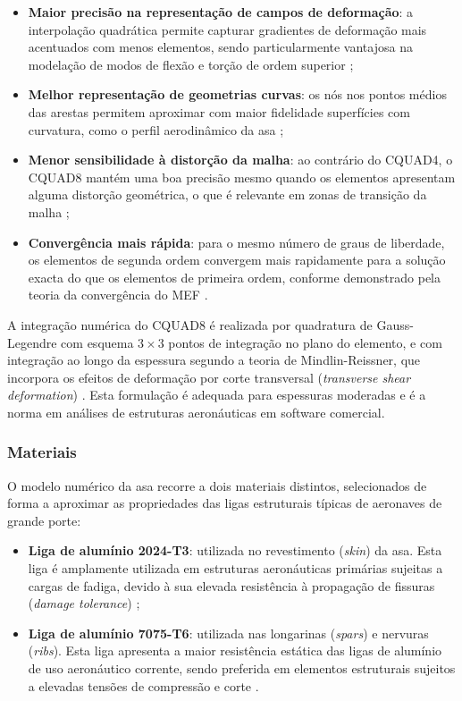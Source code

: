 \documentclass[a4paper,fleqn]{cas-sc}
\begin{document}
\begin{itemize}
    \item \textbf{Maior precisão na representação de campos de deformação}: a interpolação quadrática permite capturar gradientes de deformação mais acentuados com menos elementos, sendo particularmente vantajosa na modelação de modos de flexão e torção de ordem superior \cite{Bathe2014};

    \item \textbf{Melhor representação de geometrias curvas}: os nós nos pontos médios das arestas permitem aproximar com maior fidelidade superfícies com curvatura, como o perfil aerodinâmico da asa \cite{Zienkiewicz2005};

    \item \textbf{Menor sensibilidade à distorção da malha}: ao contrário do CQUAD4, o CQUAD8 mantém uma boa precisão mesmo quando os elementos apresentam alguma distorção geométrica, o que é relevante em zonas de transição da malha \cite{Cook2001};

    \item \textbf{Convergência mais rápida}: para o mesmo número de graus de liberdade, os elementos de segunda ordem convergem mais rapidamente para a solução exacta do que os elementos de primeira ordem, conforme demonstrado pela teoria da convergência do MEF \cite{Bathe2014}.
\end{itemize}

A integração numérica do CQUAD8 é realizada por quadratura de Gauss-Legendre com esquema $3 \times 3$ pontos de integração no plano do elemento, e com integração ao longo da espessura segundo a teoria de Mindlin-Reissner, que incorpora os efeitos de deformação por corte transversal (\textit{transverse shear deformation}) \cite{Nastran2014}. Esta formulação é adequada para espessuras moderadas e é a norma em análises de estruturas aeronáuticas em software comercial.

\subsubsection{Materiais}

O modelo numérico da asa recorre a dois materiais distintos, selecionados de forma a aproximar as propriedades das ligas estruturais típicas de aeronaves de grande porte:

\begin{itemize}
    \item \textbf{Liga de alumínio 2024-T3}: utilizada no revestimento (\textit{skin}) da asa. Esta liga é amplamente utilizada em estruturas aeronáuticas primárias sujeitas a cargas de fadiga, devido à sua elevada resistência à propagação de fissuras (\textit{damage tolerance}) \cite{Megson2012, ASM2008};

    \item \textbf{Liga de alumínio 7075-T6}: utilizada nas longarinas (\textit{spars}) e nervuras (\textit{ribs}). Esta liga apresenta a maior resistência estática das ligas de alumínio de uso aeronáutico corrente, sendo preferida em elementos estruturais sujeitos a elevadas tensões de compressão e corte \cite{Megson2012, ASM2008}.
\end{itemize}
\end{document}
